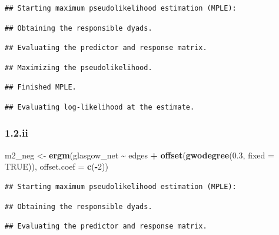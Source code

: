 \documentclass[
]{article}
\newenvironment{Shaded}{\begin{snugshade}}{\end{snugshade}}
\newcommand{\AttributeTok}[1]{\textcolor[rgb]{0.13,0.29,0.53}{#1}}
\newcommand{\ConstantTok}[1]{\textcolor[rgb]{0.56,0.35,0.01}{#1}}
\newcommand{\DecValTok}[1]{\textcolor[rgb]{0.00,0.00,0.81}{#1}}
\newcommand{\FloatTok}[1]{\textcolor[rgb]{0.00,0.00,0.81}{#1}}
\newcommand{\FunctionTok}[1]{\textcolor[rgb]{0.13,0.29,0.53}{\textbf{#1}}}
\newcommand{\NormalTok}[1]{#1}
\newcommand{\OtherTok}[1]{\textcolor[rgb]{0.56,0.35,0.01}{#1}}
\newcommand{\SpecialCharTok}[1]{\textcolor[rgb]{0.81,0.36,0.00}{\textbf{#1}}}
\begin{document}
\begin{verbatim}
## Starting maximum pseudolikelihood estimation (MPLE):
\end{verbatim}

\begin{verbatim}
## Obtaining the responsible dyads.
\end{verbatim}

\begin{verbatim}
## Evaluating the predictor and response matrix.
\end{verbatim}

\begin{verbatim}
## Maximizing the pseudolikelihood.
\end{verbatim}

\begin{verbatim}
## Finished MPLE.
\end{verbatim}

\begin{verbatim}
## Evaluating log-likelihood at the estimate.
\end{verbatim}

\subsubsection{1.2.ii}\label{ii-1}

\begin{Shaded}
\begin{Highlighting}[]
\NormalTok{m2\_neg }\OtherTok{\textless{}{-}} \FunctionTok{ergm}\NormalTok{(glasgow\_net }\SpecialCharTok{\textasciitilde{}}\NormalTok{ edges }\SpecialCharTok{+} \FunctionTok{offset}\NormalTok{(}\FunctionTok{gwodegree}\NormalTok{(}\FloatTok{0.3}\NormalTok{, }\AttributeTok{fixed =} \ConstantTok{TRUE}\NormalTok{)),}
               \AttributeTok{offset.coef =} \FunctionTok{c}\NormalTok{(}\SpecialCharTok{{-}}\DecValTok{2}\NormalTok{))}
\end{Highlighting}
\end{Shaded}

\begin{verbatim}
## Starting maximum pseudolikelihood estimation (MPLE):
\end{verbatim}

\begin{verbatim}
## Obtaining the responsible dyads.
\end{verbatim}

\begin{verbatim}
## Evaluating the predictor and response matrix.
\end{verbatim}
\end{document}
